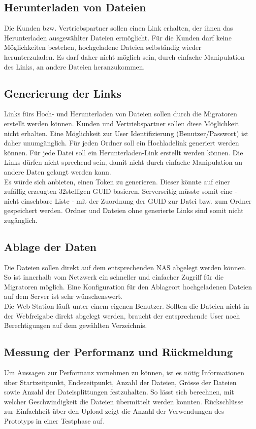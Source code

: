 \subsection{Herunterladen von Dateien}
Die Kunden bzw. Vertriebspartner sollen einen Link erhalten, der ihnen das Herunterladen ausgewählter Dateien ermöglicht.
Für die Kunden darf keine Möglichkeiten bestehen, hochgeladene Dateien selbständig wieder herunterzuladen. 
Es darf daher nicht möglich sein, durch einfache Manipulation des Links, an andere Dateien heranzukommen.

\subsection{Generierung der Links}\label{subsec:Links}
Links fürs Hoch-  und Herunterladen von Dateien sollen durch die Migratoren erstellt werden können. Kunden und Vertriebspartner sollen diese Möglichkeit nicht erhalten. 
Eine Möglichkeit zur User Identifizierung (Benutzer/Passwort) ist daher unumgänglich.
Für jeden Ordner soll ein Hochladelink generiert werden können. Für jede Datei soll ein Herunterladen-Link erstellt werden können. 
Die Links dürfen nicht sprechend sein, damit nicht durch einfache Manipulation an andere Daten gelangt werden kann. 
\\ 
Es würde sich anbieten, einen Token zu generieren. Dieser könnte auf einer zufällig erzeugten 32stelligen GUID basieren.
Serverseitig müsste somit eine - nicht einsehbare Liste - mit der Zuordnung der GUID zur Datei bzw. zum Ordner gespeichert werden.
Ordner und Dateien ohne generierte Links sind somit nicht zugänglich.

\subsection{Ablage der Daten}
Die Dateien sollen direkt auf dem entsprechenden NAS abgelegt werden können. So ist innerhalb vom Netzwerk ein schneller und einfacher Zugriff für die Migratoren möglich.
Eine Konfiguration für den Ablageort hochgeladenen Dateien auf dem Server ist sehr wünschenswert.
\\
Die Web Station läuft unter einem eigenen Benutzer. 
Sollten die Dateien nicht in der Webfreigabe direkt abgelegt werden, braucht der entsprechende User noch Berechtigungen auf dem gewählten Verzeichnis.

\subsection{Messung der Performanz und Rückmeldung}
Um Aussagen zur Performanz vornehmen zu können, ist es nötig Informationen über Startzeitpunkt, Endezeitpunkt, Anzahl der Dateien, Grösse der Dateien sowie Anzahl der Dateisplittungen festzuhalten.
So lässt sich berechnen, mit welcher Geschwindigkeit die Dateien übermittelt werden konnten.
Rückschlüsse zur Einfachheit über den Upload zeigt die Anzahl der Verwendungen des Prototyps in einer Testphase auf.


